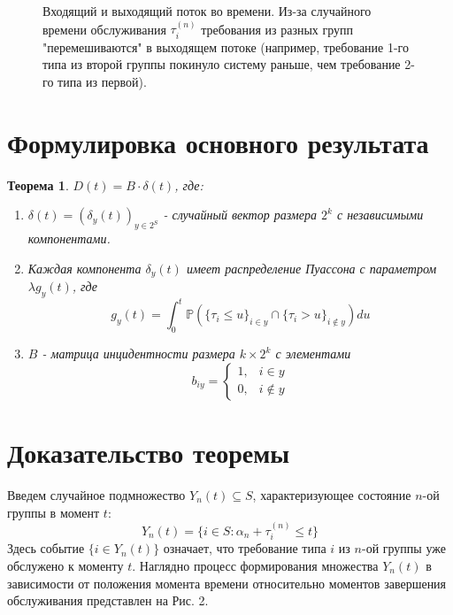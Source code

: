 \documentclass[12pt]{article}
\theoremstyle{plain}
\newtheorem{theorem}{Теорема}[section]
\theoremstyle{definition}
\theoremstyle{remark}
\begin{document}
\begin{figure}[h!]
    \caption{Входящий и выходящий поток во времени. Из-за случайного времени обслуживания $\tau_i^{(n)}$ требования из разных групп "перемешиваются" в выходящем потоке (например, требование 1-го типа из второй группы покинуло систему раньше, чем требование 2-го типа из первой).}
    \label{fig:timeline}
\end{figure}
\vspace{1em}

\section{Формулировка основного результата}
\begin{theorem}
$D(t) = B \cdot \delta(t)$, где:
\begin{enumerate}
    \item $\delta(t) = (\delta_y(t))_{y \in 2^S}$ - случайный вектор размера $2^k$ с независимыми компонентами.
    \item Каждая компонента $\delta_y(t)$ имеет распределение Пуассона с параметром $\lambda g_y(t)$, где
    \[
        g_y(t) = \int_0^t\mathbb{P}(\{\tau_i \le u\}_{i \in y} \cap \{\tau_i > u\}_{i \not\in y}) du
    \]
    \item 
    $B$ - матрица инцидентности размера $k \times 2^k$ с элементами
    \[
        b_{iy} =  \begin{cases}
            1,  & i \in y \\
            0, & i \not\in y
        \end{cases}
    \]
\end{enumerate}
\end{theorem}

\section{Доказательство теоремы}

Введем случайное подмножество $Y_n(t) \subseteq S$, характеризующее состояние $n$-ой группы в момент $t$:
\[
    Y_n(t) = \{i \in S : \alpha_n + \tau_i^{(n)} \le t\}
\]
Здесь событие $\{ i \in Y_n(t)\}$ означает, что требование типа $i$ из $n$-ой группы уже обслужено к моменту $t$. Наглядно процесс формирования множества $Y_n(t)$ в зависимости от положения момента времени относительно моментов завершения обслуживания представлен на Рис. 2.
\end{document}
